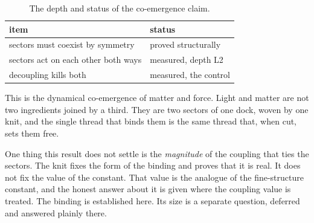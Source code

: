 \begin{table}[ht]
\centering
\begin{tabular}{@{}ll@{}}
\toprule
item & status \\
\midrule
sectors must coexist by symmetry & proved structurally \\
sectors act on each other both ways & measured, depth L2 \\
decoupling kills both & measured, the control \\
\bottomrule
\end{tabular}
\caption{The depth and status of the co-emergence claim.}
\label{tab:co-emergence-status}
\end{table}

This is the dynamical co-emergence of matter and force. Light and matter are not two ingredients joined by a third. They are two sectors of one dock, woven by one knit, and the single thread that binds them is the same thread that, when cut, sets them free.

One thing this result does not settle is the \emph{magnitude} of the coupling that ties the sectors. The knit fixes the form of the binding and proves that it is real. It does not fix the value of the constant. That value is the analogue of the fine-structure constant, and the honest answer about it is given where the coupling value is treated. The binding is established here. Its size is a separate question, deferred and answered plainly there.
